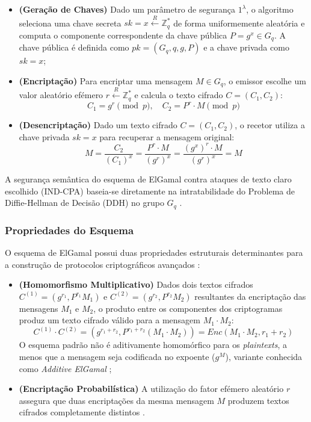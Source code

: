 \begin{itemize}
    \item \textbf{(Geração de Chaves)} Dado um parâmetro de segurança $1^\lambda$, o algoritmo seleciona uma chave secreta $sk = x \xleftarrow{R} \mathbb{Z}_q^*$ de forma uniformemente aleatória e computa o componente correspondente da chave pública $P = g^x \in G_q$. A chave pública é definida como $pk = (G_q, q, g, P)$ e a chave privada como $sk = x$;
    \item \textbf{(Encriptação)} Para encriptar uma mensagem $M \in G_q$, o emissor escolhe um valor aleatório efémero $r \xleftarrow{R} \mathbb{Z}_q^*$ e calcula o texto cifrado $C = (C_1, C_2)$:
    \begin{equation*}
        C_1 = g^r \pmod{p}, \quad C_2 = P^r \cdot M \pmod{p}
    \end{equation*}
    \item \textbf{(Desencriptação)} Dado um texto cifrado $C = (C_1, C_2)$, o recetor utiliza a chave privada $sk = x$ para recuperar a mensagem original:
    \begin{equation*}
        M = \frac{C_2}{(C_1)^x} = \frac{P^r \cdot M}{(g^r)^x} = \frac{(g^x)^r \cdot M}{(g^r)^x} = M
    \end{equation*}
\end{itemize}

A segurança semântica do esquema de ElGamal contra ataques de texto claro escolhido (IND-CPA) baseia-se diretamente na intratabilidade do Problema de Diffie-Hellman de Decisão (DDH) no grupo $G_q$ \cite{crites2025syra}.

\subsubsection{Propriedades do Esquema}

O esquema de ElGamal possui duas propriedades estruturais determinantes para a construção de protocolos criptográficos avançados \cite{brandt2005efficient}:

\begin{itemize}
    \item \textbf{(Homomorfismo Multiplicativo)} Dados dois textos cifrados $C^{(1)} = (g^{r_1}, P^{r_1}M_1)$ e $C^{(2)} = (g^{r_2}, P^{r_2}M_2)$ resultantes da encriptação das mensagens $M_1$ e $M_2$, o produto entre os componentes dos criptogramas produz um texto cifrado válido para a mensagem $M_1 \cdot M_2$:
    \begin{equation*}
        C^{(1)} \cdot C^{(2)} = (g^{r_1+r_2}, P^{r_1+r_2}(M_1 \cdot M_2)) = Enc(M_1 \cdot M_2, r_1+r_2)
    \end{equation*}
    O esquema padrão não é aditivamente homomórfico para os \textit{plaintexts}, a menos que a mensagem seja codificada no expoente ($g^M$), variante conhecida como \textit{Additive ElGamal} \cite{ge2024hybrid};
    \item \textbf{(Encriptação Probabilística)} A utilização do fator efémero aleatório $r$ assegura que duas encriptações da mesma mensagem $M$ produzem textos cifrados completamente distintos \cite{elgamal1985public}.
\end{itemize}

